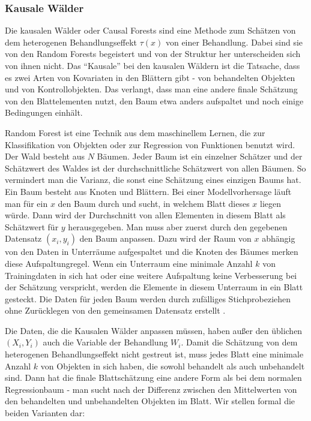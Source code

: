 \documentclass[12pt,a4paper,twoside]{scrartcl}
\numberwithin{equation}{section}
\begin{document}
\subsubsection{Kausale Wälder}\label{subsubsec:kausaleWälder}
Die kausalen Wälder oder Causal Forests sind eine Methode zum Schätzen von dem heterogenen Behandlungseffekt $\tau(x)$ von einer Behandlung. Dabei sind sie von den Random Forests begeistert und von der Struktur her unterscheiden sich von ihnen nicht. Das \enquote{Kausale} bei den kausalen Wäldern ist die Tatsache, dass es zwei Arten von Kovariaten in den Blättern gibt - von behandelten Objekten und von Kontrollobjekten. Das verlangt, dass man eine andere finale Schätzung von den Blattelementen nutzt, den Baum etwa anders aufspaltet und noch einige Bedingungen einhält\cite{wager2018estimation}. \par

\noindent
Random Forest ist eine Technik aus dem maschinellem Lernen, die zur Klassifikation von Objekten oder zur Regression von Funktionen benutzt wird. Der Wald besteht aus $N$ Bäumen. Jeder Baum ist ein einzelner Schätzer und der Schätzwert des Waldes ist der durchschnittliche Schätzwert von allen Bäumen. So vermindert man die Varianz, die sonst eine Schätzung eines einzigen Baums hat. Ein Baum besteht aus Knoten und Blättern. Bei einer Modellvorhersage läuft man für ein $x$ den Baum durch und sucht, in welchem Blatt dieses $x$ liegen würde. Dann wird der Durchschnitt von allen Elementen in diesem Blatt als Schätzwert für $y$ herausgegeben. Man muss aber zuerst durch den gegebenen Datensatz $(x_i,y_i)$ den Baum anpassen. Dazu wird der Raum von $x$ abhängig von den Daten in Unterräume aufgespaltet und die Knoten des Bäumes merken diese Aufspaltungregel. Wenn ein Unterraum eine minimale Anzahl $k$ von Trainingdaten in sich hat oder eine weitere Aufspaltung keine Verbesserung bei der Schätzung verspricht, werden die Elemente in diesem Unterraum in ein Blatt gesteckt. Die Daten für jeden Baum werden durch zufälliges Stichprobeziehen ohne Zurücklegen von den gemeinsamen Datensatz erstellt \cite{breiman2001random}.\par

\noindent
Die Daten, die die Kausalen Wälder anpassen müssen, haben außer den üblichen $(X_i,Y_i)$ auch die Variable der Behandlung $W_i$. Damit die Schätzung von dem heterogenen Behandlungseffekt nicht gestreut ist, muss jedes Blatt eine minimale Anzahl $k$ von Objekten in sich haben, die sowohl behandelt als auch unbehandelt sind. Dann hat die finale Blattschätzung eine andere Form als bei dem normalen Regressionbaum - man sucht nach der Differenz zwischen den Mittelwerten von den behandelten und unbehandelten Objekten im Blatt\cite{wager2018estimation}. Wir stellen formal die beiden Varianten dar: \par 
\end{document}
